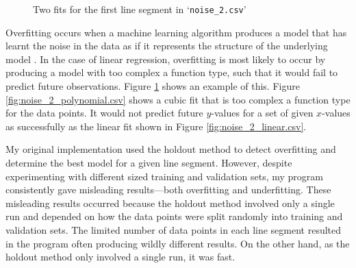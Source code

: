 \documentclass[onecolumn, 12pt, a4paper]{article}
\begin{document}
\begin{figure}[htbp]
    \centering
    \hfill
    \caption{Two fits for the first line segment in `\texttt{noise\_2.csv}'}
    \label{fig:noise_2.csv}
\end{figure}

Overfitting occurs when a machine learning algorithm
produces a model that has learnt the noise in the data
as if it represents the structure of the underlying
model \cite{MSMI}.
In the case of linear regression, overfitting is most
likely to occur by producing a model with too complex a function
type, such that it would fail to predict future observations.
Figure \ref{fig:noise_2.csv} shows an example of this. 
Figure \ref{fig:noise_2_polynomial.csv} shows a cubic fit that is too complex a 
function type for the data points.
It would not predict future $y$-values for a set of 
given $x$-values as successfully as the linear fit shown in Figure \ref{fig:noise_2_linear.csv}.

My original implementation used the holdout method
to detect overfitting and determine the best model for a given line segment.
However, despite experimenting with different
sized training and validation sets, my program consistently gave
misleading results---both overfitting and underfitting.
These misleading results occurred because the holdout method involved only a single run 
and depended on how the data points were split randomly into training and validation sets.
The limited number of data points in each line segment resulted 
in the program often producing wildly different results.
On the other hand, as the holdout method only involved a single run, it was fast.
\end{document}
